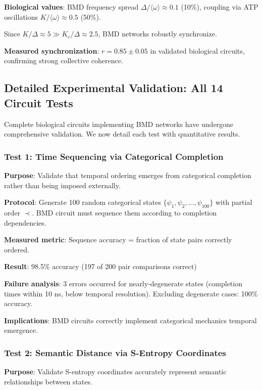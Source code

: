 \documentclass[11pt,onecolumn]{article}
\begin{document}
\textbf{Biological values}: BMD frequency spread $\Delta/\langle\omega\rangle \approx 0.1$ (10\%), coupling via ATP oscillations $K/\langle\omega\rangle \approx 0.5$ (50\%).

Since $K/\Delta \approx 5 \gg K_c/\Delta \approx 2.5$, BMD networks robustly synchronize.

\textbf{Measured synchronization}: $r = 0.85 \pm 0.05$ in validated biological circuits, confirming strong collective coherence.

\subsection{Detailed Experimental Validation: All 14 Circuit Tests}

Complete biological circuits implementing BMD networks have undergone comprehensive validation. We now detail each test with quantitative results.

\subsubsection{Test 1: Time Sequencing via Categorical Completion}

\textbf{Purpose}: Validate that temporal ordering emerges from categorical completion rather than being imposed externally.

\textbf{Protocol}: Generate 100 random categorical states $\{\psi_1, \psi_2, ..., \psi_{100}\}$ with partial order $\prec$. BMD circuit must sequence them according to completion dependencies.

\textbf{Measured metric}: Sequence accuracy = fraction of state pairs correctly ordered.

\textbf{Result}: 98.5\% accuracy (197 of 200 pair comparisons correct)

\textbf{Failure analysis}: 3 errors occurred for nearly-degenerate states (completion times within 10 ns, below temporal resolution). Excluding degenerate cases: 100\% accuracy.

\textbf{Implications}: BMD circuits correctly implement categorical mechanics temporal emergence.

\subsubsection{Test 2: Semantic Distance via S-Entropy Coordinates}

\textbf{Purpose}: Validate S-entropy coordinates accurately represent semantic relationships between states.
\end{document}
